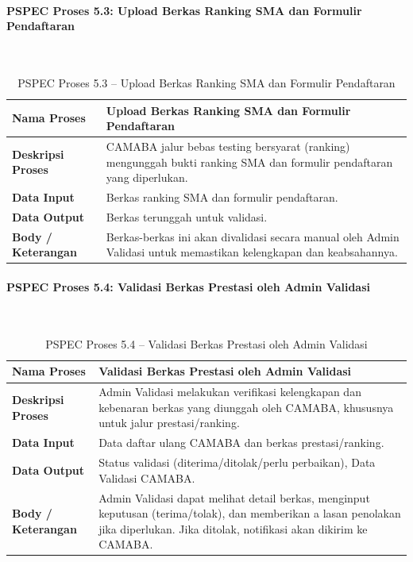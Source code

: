 \paragraph{PSPEC Proses 5.3: Upload Berkas Ranking SMA dan Formulir Pendaftaran}~\\
\begin{longtable}{|p{}|p{}|}
	\caption{PSPEC Proses 5.3 -- Upload Berkas Ranking SMA dan Formulir Pendaftaran}
	\label{table:3.pspec53}\\
	\hline
	\textbf{Nama Proses} & Upload Berkas Ranking SMA dan Formulir Pendaftaran \\
	\hline
	\textbf{Deskripsi Proses} & CAMABA jalur bebas testing bersyarat (ranking) mengunggah bukti ranking SMA dan formulir pendaftaran yang diperlukan. \\
	\hline
	\textbf{Data Input} & Berkas ranking SMA dan formulir pendaftaran. \\
	\hline
	\textbf{Data Output} & Berkas terunggah untuk validasi. \\
	\hline
	\textbf{Body / Keterangan} & Berkas-berkas ini akan divalidasi secara manual oleh Admin Validasi untuk memastikan kelengkapan dan keabsahannya. \\
	\hline
\end{longtable}

\paragraph{PSPEC Proses 5.4: Validasi Berkas Prestasi oleh Admin Validasi}~\\
\begin{longtable}{|p{}|p{}|}
	\caption{PSPEC Proses 5.4 -- Validasi Berkas Prestasi oleh Admin Validasi}
	\label{table:3.pspec54}\\
	\hline
	\textbf{Nama Proses} & Validasi Berkas Prestasi oleh Admin Validasi \\
	\hline
	\textbf{Deskripsi Proses} & Admin Validasi melakukan verifikasi kelengkapan dan kebenaran berkas yang diunggah oleh CAMABA, khususnya untuk jalur prestasi/ranking. \\
	\hline
	\textbf{Data Input} & Data daftar ulang CAMABA dan berkas prestasi/ranking. \\
	\hline
	\textbf{Data Output} & Status validasi (diterima/ditolak/perlu perbaikan), Data Validasi CAMABA. \\
	\hline
	\textbf{Body / Keterangan} & Admin Validasi dapat melihat detail berkas, menginput keputusan (terima/tolak), dan memberikan a lasan penolakan jika diperlukan. Jika ditolak, notifikasi akan dikirim ke CAMABA. \\
	\hline
\end{longtable}

